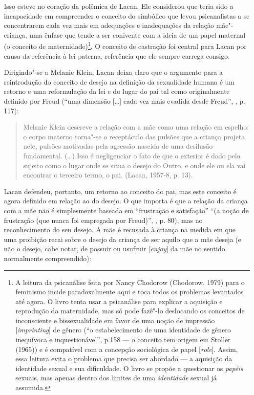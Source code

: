 Isso esteve no coração da polêmica de Lacan. Ele considerou que teria
sido a incapacidade em compreender o conceito do simbólico que levou
psicanalistas a se concentrarem cada vez mais em adequações e
inadequações da relação mãe"-criança, uma ênfase que tende a ser
conivente com a ideia de um papel maternal (o conceito de
maternidade)\footnote{A leitura da psicanálise feita por Nancy Chodorow
  (Chodorow, 1979) para o feminismo incide paradoxalmente aqui e toca
  todos os problemas levantados até agora. O livro tenta usar a
  psicanálise para explicar a aquisição e reprodução da maternidade, mas
  só pode fazê"-lo deslocando os conceitos de inconsciente e
  bissexualidade em favor de uma noção de impressão
  {[}\emph{imprinting}{]} de gênero (``o estabelecimento de uma
  identidade de gênero inequívoca e inquestionável'', p.158 --- o
  conceito tem origem em Stoller (1965)) e é compatível com a concepção
  sociológica de papel {[}\emph{role}{]}. Assim, essa leitura evita o
  problema que precisa ser abordado --- a aquisição da identidade sexual
  e sua dificuldade. O livro se propõe a questionar os \emph{papéis}
  sexuais, mas apenas dentro dos limites de uma \emph{identidade} sexual
  já assumida.}. O conceito de castração foi central para Lacan por
causa da referência à lei paterna, referência que ele sempre carrega
consigo.

Dirigindo"-se a Melanie Klein, Lacan deixa claro que o argumento para a
reintrodução do conceito de desejo na definição da sexualidade humana é
um retorno e uma reformulação da lei e do lugar do pai tal como
originalmente definido por Freud (``uma dimensão {[}\ldots{}{]} cada vez mais
evadida desde Freud'', , p. 117):

\begin{quote}
Melanie Klein descreve a relação com a mãe como uma relação em espelho:
o corpo materno torna"-se o receptáculo das pulsões que a criança projeta
nele, pulsões motivadas pela agressão nascida de uma desilusão
fundamental. (\ldots{}) Isso é negligenciar o fato de que o exterior é dado
pelo sujeito como o lugar onde se situa o desejo do Outro, e onde ele ou
ela vai encontrar o terceiro termo, o pai. (Lacan, 1957-8, p. 13).
\end{quote}

Lacan defendeu, portanto, um retorno ao conceito do pai, mas este
conceito é agora definido em relação ao do desejo. O que importa é que a
relação da criança com a mãe não é simplesmente baseada em ``frustração e
satisfação'' ``(a noção de frustração (que nunca foi empregada por %
Freud)'', , p. 80), mas no reconhecimento do seu desejo. A mãe é
recusada à criança na medida em que uma proibição recai sobre o desejo
da criança de ser aquilo que a mãe deseja (e não o desejo, cabe notar,
de possuir ou usufruir {[}\emph{enjoy}{]} da mãe no sentido normalmente
compreendido):

